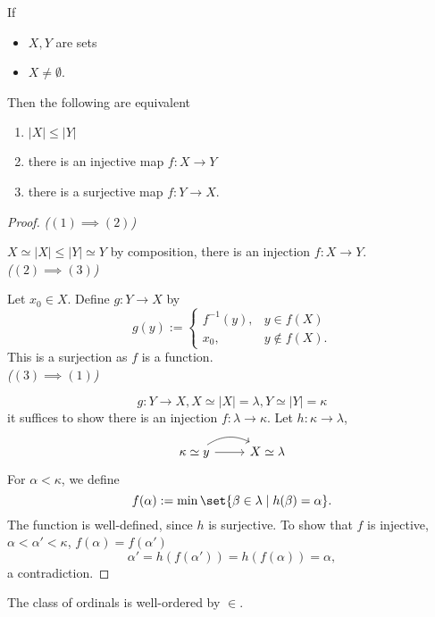 \begin{proposition}
    If \begin{itemize}
        \item $X, Y$ are sets
        \item $X \ne \emptyset$.
    \end{itemize}
    Then the following are equivalent
    \begin{enumerate}[label=(\arabic*)]
        \item $|X| \leq |Y|$
        \item there is an injective map $f: X \to Y$
        \item there is a surjective map $f: Y \to X$.
    \end{enumerate}
\end{proposition}
\begin{proof}
    \emph{($(1) \implies (2)$)} 
    
    $X \simeq |X| \leq |Y| \simeq Y$ by composition, there is an injection $f: X \to Y$.\\
    \emph{($(2) \implies (3)$)}

    Let $x_0 \in X$. Define $g: Y \to X$ by 
    $$ g(y) := \begin{cases}
        f^{-1}(y), & y \in f(X)\\
        x_0, & y \notin f(X).
    \end{cases}$$
    This is a surjection as $f$ is a function.\\
    \emph{($(3) \implies (1)$)}

    $$g: Y \to X, X \simeq |X| = \lambda, Y \simeq |Y| = \kappa$$
    it suffices to show there is an injection $f: \lambda \to \kappa$. 
    Let $h: \kappa \to \lambda$, 
    $$ \begin{tikzcd}
        \kappa \simeq y \arrow[r]{g} \arrow[r, bend left]{h} & X \simeq \lambda
    \end{tikzcd}$$
    For $\alpha < \kappa$, we define 
    $$ f(\alpha) := \min \set{\beta \in \lambda \mid h(\beta) = \alpha}. $$
    The function is well-defined, since $h$ is surjective.
    To show that $f$ is injective, $\alpha < \alpha' < \kappa$, $f(\alpha) = f(\alpha')$
    $$ \alpha' = h(f(\alpha')) = h(f(\alpha)) = \alpha,$$
    a contradiction.
\end{proof}

\begin{exercise}
    The class of ordinals is well-ordered by $\in$.
\end{exercise}

